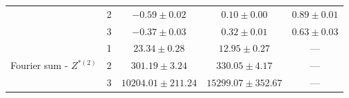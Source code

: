 \begin{table}[ht]
{\begin{tabular}{ccccc}
                                                                               & 2                                    & $-0.59 \pm 0.02$ & $0.10 \pm 0.00$ & $0.89 \pm 0.01$ \\
                                                                               & 3                                    & $-0.37 \pm 0.03$ & $0.32 \pm 0.01$ & $0.63 \pm 0.03$ \\ \hline
\multirow{3}{*}{Fourier sum - $Z^{*(2)}$}                                      & 1                                    & $23.34 \pm 0.28$ & $12.95 \pm 0.27$ & ---             \\
                                                                               & 2                                    & $301.19 \pm 3.24$ & $330.05 \pm 4.17$ & ---             \\
                                                                               & 3                                    & $10204.01 \pm 211.24$ & $15299.07 \pm 352.67$ & ---             \\ \hline
\end{tabular}
    }
    \label{table:emis_dists}
\end{table}



